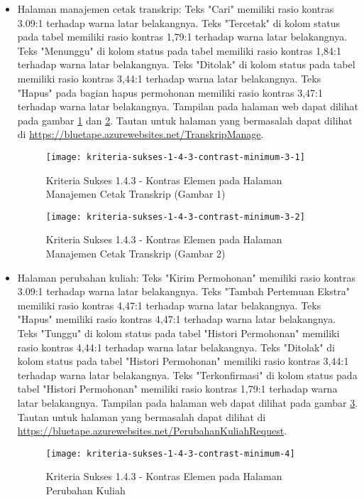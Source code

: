 \begin{itemize}
    \item Halaman manajemen cetak transkrip: Teks "Cari" memiliki rasio kontras 3.09:1 terhadap warna latar belakangnya. Teks "Tercetak" di kolom status pada tabel memiliki rasio kontras 1,79:1 terhadap warna latar belakangnya. Teks "Menunggu" di kolom status pada tabel memiliki rasio kontras 1,84:1 terhadap warna latar belakangnya. Teks "Ditolak" di kolom status pada tabel memiliki rasio kontras 3,44:1 terhadap warna latar belakangnya. Teks "Hapus" pada bagian hapus permohonan memiliki rasio kontras 3,47:1 terhadap warna latar belakangnya. Tampilan pada halaman web dapat dilihat pada gambar \ref{fig:1.4.3_contrast_minimum_3_1} dan \ref{fig:1.4.3_contrast_minimum_3_2}. Tautan untuk halaman yang bermasalah dapat dilihat di \url{https://bluetape.azurewebsites.net/TranskripManage}.
    \begin{figure}[H]
        \centering  
        \texttt{[image: kriteria-sukses-1-4-3-contrast-minimum-3-1]}  
        \caption[Kriteria Sukses 1.4.3 - Kontras Elemen pada Halaman Manajemen Cetak Transkrip (Gambar 1)]{Kriteria Sukses 1.4.3 - Kontras Elemen pada Halaman Manajemen Cetak Transkrip (Gambar 1)}
        \label{fig:1.4.3_contrast_minimum_3_1}
    \end{figure} 
    
    \begin{figure}[H]
        \centering  
        \texttt{[image: kriteria-sukses-1-4-3-contrast-minimum-3-2]}  
        \caption[Kriteria Sukses 1.4.3 - Kontras Elemen pada Halaman Manajemen Cetak Transkrip (Gambar 2)]{Kriteria Sukses 1.4.3 - Kontras Elemen pada Halaman Manajemen Cetak Transkrip (Gambar 2)}
        \label{fig:1.4.3_contrast_minimum_3_2}
    \end{figure} 

    \item Halaman perubahan kuliah: Teks "Kirim Permohonan" memiliki rasio kontras 3.09:1 terhadap warna latar belakangnya. Teks "Tambah Pertemuan Ekstra" memiliki rasio kontras 4,47:1 terhadap warna latar belakangnya. Teks "Hapus" memiliki rasio kontras 4,47:1 terhadap warna latar belakangnya. Teks "Tunggu" di kolom status pada tabel "Histori Permohonan" memiliki rasio kontras 4,44:1 terhadap warna latar belakangnya. Teks "Ditolak" di kolom status pada tabel "Histori Permohonan" memiliki rasio kontras 3,44:1 terhadap warna latar belakangnya. Teks "Terkonfirmasi" di kolom status pada tabel "Histori Permohonan" memiliki rasio kontras 1,79:1 terhadap warna latar belakangnya. Tampilan pada halaman web dapat dilihat pada gambar \ref{fig:1.4.3_contrast_minimum_4}. Tautan untuk halaman yang bermasalah dapat dilihat di \url{https://bluetape.azurewebsites.net/PerubahanKuliahRequest}.
    \begin{figure}[H]
        \centering  
        \texttt{[image: kriteria-sukses-1-4-3-contrast-minimum-4]}  
        \caption[Kriteria Sukses 1.4.3 - Kontras Elemen pada Halaman Perubahan Kuliah]{Kriteria Sukses 1.4.3 - Kontras Elemen pada Halaman Perubahan Kuliah}
        \label{fig:1.4.3_contrast_minimum_4}  
    \end{figure} 
    

\end{itemize}
